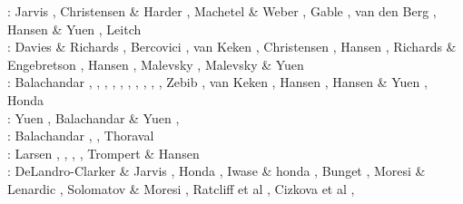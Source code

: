 \begin{scriptsize}
\nineteenninetyone: Jarvis \cite{jarv91}, Christensen \& Harder \cite{chha91},
                    Machetel \& Weber \cite{mawe91}, Gable \etal \cite{gaot91},
                    van den Berg \etal \cite{vayv91}, Hansen \& Yuen \cite{hayk91},
                    Leitch \etal \cite{leys91} \\
\nineteenninetytwo: Davies \& Richards \cite{dari92}, Bercovici \etal \cite{besg92},
                    van Keken \etal{} \cite{vayv92},
                    Christensen \cite{chri92}, Hansen \etal \cite{haym92}, 
                    Richards \& Engebretson \cite{rien92}, Hansen \etal \cite{hayk92},
                    Malevsky \etal \cite{mayw92}, Malevsky \& Yuen \cite{mayu92} \\
\nineteenninetythree: Balachandar \etal \cite{bayr93}, \cite{zhch93},
                      \cite{jarv93}, \cite{tack93},
                      \cite{bucc93}, \cite{carm93},
                      \cite{vavy93}, \cite{tasg93},
                      \cite{zhgu93}, \cite{mamc93},
                      Zebib \cite{zebi93}, van Keken \etal \cite{vayv93}, 
                      Hansen \etal \cite{hayk93}, Hansen \& Yuen \cite{hayu93},
                      Honda \etal \cite{hoyb93,hoby93}\\
\nineteenninetyfour: Yuen \etal \cite{yurb94}, Balachandar \& Yuen \cite{bayu94}, \cite{haeb94}
                     \cite{chho94}\cite{tasg94}\cite{itki94}\cite{leka94}\cite{scha94}\\
\nineteenninetyfive: Balachandar \etal \cite{bayr95,bayr95b}, \cite{zhgu95}
                     \cite{vayv95}\cite{buba95}\cite{rasz95}\cite{berc95}\cite{puhj95}\cite{pujh95}
      \cite{solo95}\cite{vayu95}\cite{matb95}, Thoraval \etal \cite{thmc95}\\
\nineteenninetysix: Larsen \etal \cite{laym96}, \cite{zhyu96},
                    \cite{hond96}\cite{rytr96a}
                    \cite{rytr96b}\cite{tack96}
                    \cite{trbo96}, \cite{birg96}
                    \cite{burb96}\cite{kafo96}
                    \cite{guez96}\cite{vayu96}
                    \cite{rasz96}\cite{rasz96b}
                    \cite{leka96}\cite{iwas96}
                    \cite{buri96}\cite{schh96}, Trompert \& Hansen \cite{trha96}\\
\nineteenninetyseven: DeLandro-Clarker \& Jarvis \cite{deja97}, Honda \cite{hond97}, 
                      Iwase \& honda \cite{iwho97}, Bunget \etal \cite{burb97},
                      Moresi \& Lenardic \cite{mole97}, Solomatov \& Moresi \cite{somo97},
                      Ratcliff et al \cite{rats97}, Cizkova et al \cite{cicv97},

\end{scriptsize}
